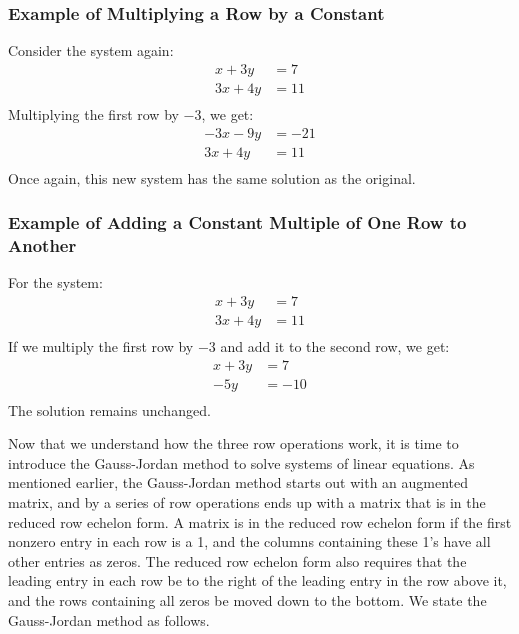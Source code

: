 \subsubsection*{Example of Multiplying a Row by a Constant}
Consider the system again:
\[
    \begin{aligned}
        x + 3y  & = 7  \\
        3x + 4y & = 11 \\
    \end{aligned}
\]
Multiplying the first row by $-3$, we get:
\[
    \begin{aligned}
        -3x - 9y & = -21 \\
        3x + 4y  & = 11  \\
    \end{aligned}
\]
Once again, this new system has the same solution as the original.

\subsubsection*{Example of Adding a Constant Multiple of One Row to Another}
For the system:
\[
    \begin{aligned}
        x + 3y  & = 7  \\
        3x + 4y & = 11 \\
    \end{aligned}
\]
If we multiply the first row by $-3$ and add it to the second row, we get:
\[
    \begin{aligned}
        x + 3y & = 7   \\
        -5y    & = -10 \\
    \end{aligned}
\]
The solution remains unchanged.


Now that we understand how the three row operations work, it is time to introduce the Gauss-Jordan method to solve systems of linear equations.
As mentioned earlier, the Gauss-Jordan method starts out with an augmented matrix, and by a series of row operations ends up with a matrix that is in the reduced row echelon form.
A matrix is in the reduced row echelon form if the first nonzero entry in each row is a 1, and the columns containing these 1's have all other entries as zeros.   The reduced row echelon form also requires that the leading entry in each row be to the right of the leading entry in the row above it, and the rows containing all zeros be moved down to the bottom.
We state the Gauss-Jordan method as follows.


